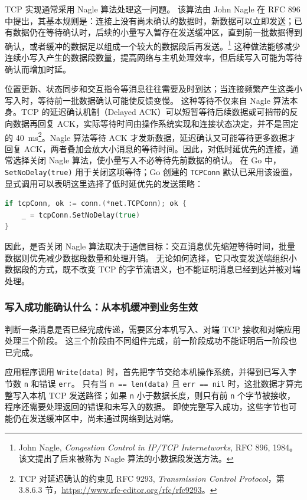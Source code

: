 TCP 实现通常采用 Nagle 算法处理这一问题。
该算法由 John Nagle 在 RFC 896 中提出，其基本规则是：连接上没有尚未确认的数据时，新数据可以立即发送；已有数据仍在等待确认时，后续的小量写入暂存在发送缓冲区，直到前一批数据得到确认，或者缓冲的数据足以组成一个较大的数据段后再发送。\footnote{John Nagle, \textit{Congestion Control in IP/TCP Internetworks}, RFC 896, 1984。该文提出了后来被称为 Nagle 算法的小数据段发送方法。}
这种做法能够减少连续小写入产生的数据段数量，提高网络与主机处理效率，但后续写入可能为等待确认而增加时延。

位置更新、状态同步和交互指令等消息往往需要及时到达；当连接频繁产生这类小写入时，等待前一批数据确认可能使反馈变慢。
这种等待不仅来自 Nagle 算法本身。TCP 的延迟确认机制（Delayed ACK）可以短暂等待后续数据或可捎带的反向数据再回复 ACK，实际等待时间由操作系统实现和连接状态决定，并不是固定的 40~ms\footnote{TCP 对延迟确认的约束见 RFC 9293, \textit{Transmission Control Protocol}，第 3.8.6.3 节，\url{https://www.rfc-editor.org/rfc/rfc9293}。}。Nagle 算法等待 ACK 才发新数据，延迟确认又可能等待更多数据才回复 ACK，两者叠加会放大小消息的等待时间。因此，对低时延优先的连接，通常选择关闭 Nagle 算法，使小量写入不必等待先前数据的确认。
在 Go 中，\texttt{SetNoDelay(true)} 用于关闭这项等待；Go 创建的 \texttt{TCPConn} 默认已采用该设置，显式调用可以表明这里选择了低时延优先的发送策略：

\begin{tcolorbox}[title=降低小消息等待的 TCP 设置（概念示例）]
\begin{lstlisting}[style=codeblock, language=go]
if tcpConn, ok := conn.(*net.TCPConn); ok {
    _ = tcpConn.SetNoDelay(true)
}
\end{lstlisting}
\end{tcolorbox}

因此，是否关闭 Nagle 算法取决于通信目标：交互消息优先缩短等待时间，批量数据则优先减少数据段数量和处理开销。
无论如何选择，它只改变发送端组织小数据段的方式，既不改变 TCP 的字节流语义，也不能证明消息已经到达并被对端处理。

\subsubsection{写入成功能确认什么：从本机缓冲到业务生效}\label{sec2:write-not-delivered}

判断一条消息是否已经完成传递，需要区分本机写入、对端 TCP 接收和对端应用处理三个阶段。
这三个阶段由不同组件完成，前一阶段成功不能证明后一阶段也已完成。

应用程序调用 \texttt{Write(data)} 时，首先把字节交给本机操作系统，并得到已写入字节数 \texttt{n} 和错误 \texttt{err}。
只有当 \texttt{n == len(data)} 且 \texttt{err == nil} 时，这批数据才算完整写入本机 TCP 发送路径；如果 \texttt{n} 小于数据长度，则只有前 \texttt{n} 个字节被接收，程序还需要处理返回的错误和未写入的数据。
即使完整写入成功，这些字节也可能仍在发送缓冲区中，尚未通过网络到达对端。

